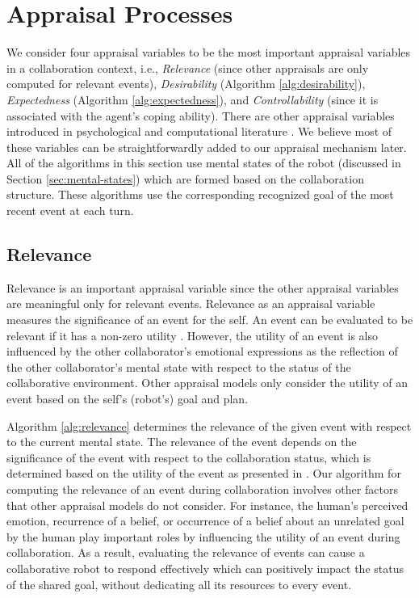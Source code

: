 \section{Appraisal Processes}
\label{sec:appraisal}

We consider four appraisal variables to be the most important appraisal
variables in a collaboration context, i.e., \textit{Relevance} (since other
appraisals are only computed for relevant events), \textit{Desirability}
(Algorithm \ref{alg:desirability}), \textit{Expectedness} (Algorithm
\ref{alg:expectedness}), and \textit{Controllability} (since it is associated
with the agent's coping ability). There are other appraisal variables introduced
in psychological \cite{scherer:appraisal-processes} and computational literature
\cite{gratch:domain-independent}. We believe most of these variables can be
straightforwardly added to our appraisal mechanism later. All of the algorithms
in this section use mental states of the robot (discussed in Section
\ref{sec:mental-states}) which are formed based on the collaboration structure.
These algorithms use the corresponding recognized goal of the most recent event
at each turn.

\subsection{Relevance}

Relevance is an important appraisal variable since the other appraisal variables
are meaningful only for relevant events. Relevance as an appraisal variable
measures the significance of an event for the self. An event can be evaluated to
be relevant if it has a non-zero utility \cite{marsella:ema-process-model}.
However, the utility of an event is also influenced by the other collaborator's
emotional expressions as the reflection of the other collaborator's mental state
with respect to the status of the collaborative environment. Other appraisal
models only consider the utility of an event based on the self's (robot's) goal
and plan.

Algorithm \ref{alg:relevance} determines the relevance of the given event with
respect to the current mental state. The relevance of the event depends on the
significance of the event with respect to the collaboration status, which is
determined based on the utility of the event as presented in
\cite{gratch:domain-independent,marsella:ema-process-model}. Our algorithm for
computing the relevance of an event during collaboration involves other factors
that other appraisal models do not consider. For instance, the human's
perceived emotion, recurrence of a belief, or occurrence of a belief about an
unrelated goal by the human play important roles by influencing the utility
of an event during collaboration. As a result, evaluating the relevance of
events can cause a collaborative robot to respond effectively which can
positively impact the status of the shared goal, without dedicating all its
resources to every event.

